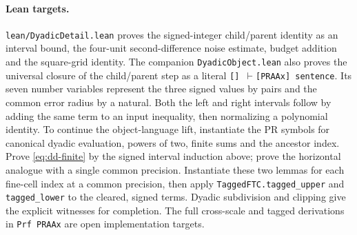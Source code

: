 \paragraph{Lean targets.}
\texttt{lean/DyadicDetail.lean} proves the signed-integer child/parent identity as an interval bound, the four-unit second-difference noise estimate, budget addition and the square-grid identity. The companion \texttt{DyadicObject.lean} also proves the universal closure of the child/parent step as a literal \texttt{[] $\vdash$[PRAAx] sentence}. Its seven number variables represent the three signed values by pairs and the common error radius by a natural. Both the left and right intervals follow by adding the same term to an input inequality, then normalizing a polynomial identity. To continue the object-language lift, instantiate the PR symbols for canonical dyadic evaluation, powers of two, finite sums and the ancestor index. Prove \eqref{eq:dd-finite} by the signed interval induction above; prove the horizontal analogue with a single common precision. Instantiate these two lemmas for each fine-cell index at a common precision, then apply \texttt{TaggedFTC.tagged\_upper} and \texttt{tagged\_lower} to the cleared, signed terms. Dyadic subdivision and clipping give the explicit witnesses for completion. The full cross-scale and tagged derivations in \texttt{Prf PRAAx} are open implementation targets.
